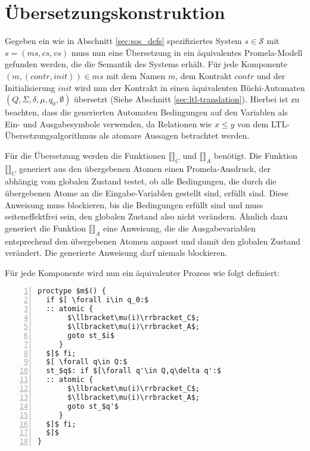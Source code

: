 \section{Übersetzungskonstruktion}
Gegeben ein wie in Abschnitt \ref{sec:sos_defs} spezifiziertes System $s\in \mathcal{S}$ mit $s=(ms,cs,vs)$ muss nun eine Übersetzung in ein äquivalentes Promela-Modell gefunden werden, die die Semantik des Systems erhält.
Für jede Komponente $(m,(\mathit{contr},\mathit{init}))\in ms$ mit dem Namen $m$, dem Kontrakt $\mathit{contr}$ und der Initialisierung $\mathit{init}$ wird nun der Kontrakt in einen äquivalenten Büchi-Automaten $(Q,\Sigma,\delta,\mu,q_0,\emptyset)$ übersetzt (Siehe Abschnitt \ref{sec:ltl-translation}).
Hierbei ist zu beachten, dass die generierten Automaten Bedingungen auf den Variablen als Ein- und Ausgabesymbole verwenden, da Relationen wie $x\leq y$ von dem LTL-Übersetzungsalgorithmus als atomare Aussagen betrachtet werden.

Für die Übersetzung werden die Funktionen $\llbracket\rrbracket_C$ und $\llbracket\rrbracket_A$ benötigt.
Die Funktion $\llbracket\rrbracket_C$ generiert aus den übergebenen Atomen einen Promela-Ausdruck, der abhängig vom globalen Zustand testet, ob alle Bedingungen, die durch die übergebenen Atome an die Eingabe-Variablen gestellt sind, erfüllt sind.
Diese Anweisung muss blockieren, bis die Bedingungen erfüllt sind und muss seiteneffektfrei sein, den globalen Zustand also nicht verändern.
Ähnlich dazu generiert die Funktion $\llbracket\rrbracket_A$ eine Anweisung, die die Ausgabevariablen entsprechend den übergebenen Atomen anpasst und damit den globalen Zustand verändert.
Die generierte Anweisung darf niemals blockieren.

Für jede Komponente wird nun ein äquivalenter Prozess wie folgt definiert:
\begin{lstlisting}[language=Promela,mathescape=true,numbers=left,numberstyle=\small,caption={Komponenten-Übersetzung als Promela-Prozess},label=lst:component]
proctype $m$() {
  if $[ \forall i\in q_0:$
  :: atomic {
       $\llbracket\mu(i)\rrbracket_C$;
       $\llbracket\mu(i)\rrbracket_A$;
       goto st_$i$
     }
  $]$ fi;
  $[ \forall q\in Q:$
  st_$q$: if $[\forall q'\in Q,q\delta q':$
  :: atomic {
       $\llbracket\mu(i)\rrbracket_C$;
       $\llbracket\mu(i)\rrbracket_A$;
       goto st_$q'$
     }
  $]$ fi;
  $]$
}
\end{lstlisting}

